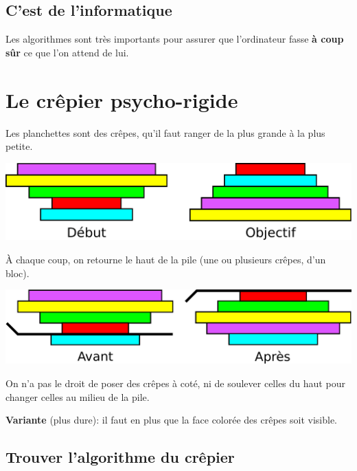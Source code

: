 \documentclass[a7paper,pagesize,DIV=14,10pt]{scrbook}
\begin{document}
\subsection*{C'est de l'informatique}
\vspace{-.5\baselineskip} %
Les algorithmes sont très importants pour assurer que l'ordinateur
fasse \textbf{à coup sûr} ce que l'on attend de lui.

\newpage
\section*{Le crêpier psycho-rigide}

\vspace{-.5\baselineskip}
Les planchettes sont des crêpes, qu'il faut ranger de la plus grande à
la plus petite.

\smallskip
\includegraphics[width=\linewidth]{img/crepes_but-du-jeu.pdf}

À chaque coup, on retourne le haut de la pile (une ou plusieurs crêpes,
d'un bloc).

\smallskip
\includegraphics[width=\linewidth]{img/crepes_un-coup.pdf}

\medskip%
On n'a pas le droit de poser des crêpes à coté, ni de soulever celles
du haut pour changer celles au milieu de la pile.

\bigskip%
\textbf{Variante} (plus dure): il faut en plus que la face colorée des
crêpes soit visible.

\newpage
\subsection*{Trouver l'algorithme du crêpier}
\vspace{-.5\baselineskip}
\end{document}
